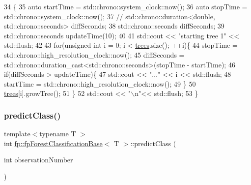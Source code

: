\begin{DoxyCode}
34                             \{
35                 \textcolor{keyword}{auto} startTime = std::chrono::system\_clock::now();
36                 \textcolor{keyword}{auto} stopTime = std::chrono::system\_clock::now();
37                 \textcolor{comment}{//  std::chrono::duration<double, std::chrono::seconds> diffSeconds;}
38                 std::chrono::seconds diffSeconds;
39                 std::chrono::seconds updateTime(10);
40 
41                 std::cout << \textcolor{stringliteral}{"starting tree 1"} << std::flush;
42 
43                 \textcolor{keywordflow}{for}(\textcolor{keywordtype}{unsigned} \textcolor{keywordtype}{int} i = 0; i < \hyperlink{classfp_1_1fpForestClassificationBase_a51482a6c95c4b3cb42627f029c2d4662}{trees}.size(); ++i)\{
44                     stopTime = std::chrono::high\_resolution\_clock::now();
45                     diffSeconds =   std::chrono::duration\_cast<std::chrono::seconds>(stopTime - startTime);
46                     \textcolor{keywordflow}{if}(diffSeconds > updateTime)\{
47                         std::cout << \textcolor{stringliteral}{"..."} << i << std::flush;
48                         startTime = std::chrono::high\_resolution\_clock::now();
49                     \}
50                     \hyperlink{classfp_1_1fpForestClassificationBase_a51482a6c95c4b3cb42627f029c2d4662}{trees}[i].growTree();
51                 \}
52                 std::cout << \textcolor{stringliteral}{"\(\backslash\)n"}<< std::flush;
53             \}
\end{DoxyCode}
\mbox{\label{classfp_1_1fpForestClassificationBase_ad0c690fff971fab681467fbcd8762b5f}} 
\subsubsection{\texorpdfstring{predict\+Class()}{predictClass()}}
{\footnotesize\ttfamily template$<$typename T $>$ \\
int \hyperlink{classfp_1_1fpForestClassificationBase}{fp\+::fp\+Forest\+Classification\+Base}$<$ T $>$\+::predict\+Class (\begin{DoxyParamCaption}\item[{int}]{observation\+Number }\end{DoxyParamCaption})\hspace{0.3cm}{\ttfamily [inline]}}



